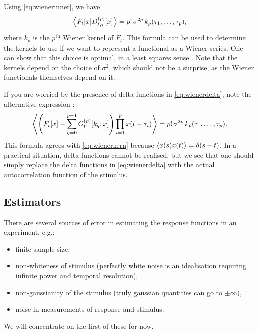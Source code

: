 \documentclass[12pt]{article}
\theoremstyle{slplain}
\theoremstyle{sldefinition}
\theoremstyle{remark}
\begin{document}
Using \eqref{eq:wienerinner}, we have
%
\begin{equation}\label{eq:wienerkern}
  \left\langle F_t[x] D^{(p)}_{t,\vec{\tau}}[x] \right\rangle = p!\,\sigma^{2p}\,k_p(\tau_1,\ldots,\tau_p),
\end{equation}
%
where $k_p$ is the $p^{\text{th}}$ Wiener kernel of $F_t$. This formula can be used to determine the kernels to use if we want to represent a functional as a Wiener series. One can show that this choice is optimal, in a least squares sense \cite[\S15.2]{schetzen:1980}. Note that the kernels depend on the choice of $\sigma^2$, which should not be a surprise, as the Wiener functionals themselves depend on it.

If you are worried by the presence of delta functions in \eqref{eq:wienerdelta}, note the alternative expression \cite{Lee1965}:
%
\begin{equation}\label{eq:wieneralt}
  \left\langle \left (  F_t[x] - \sum_{q=0}^{p-1} G_t^{(p)}[k_q;x] \right ) \prod_{i=1}^p x(t-\tau_i)  \right\rangle = p!\,\sigma^{2p}\,k_p(\tau_1,\ldots,\tau_p).
\end{equation}
%
This formula agrees with \eqref{eq:wienerkern} because $\left\langle x(s)x(t) \right\rangle=\delta(s-t)$. In a practical situation, delta functions cannot be realised, but we see that one should simply replace the delta functions in \eqref{eq:wienerdelta} with the actual autocorrelation function of the stimulus.

\subsection{Estimators}\label{sec:wienerest}

There are several sources of error in estimating the response functions in an experiment, e.g.:
\begin{itemize}
  \item finite sample size,
  \item non-whiteness of stimulus (perfectly white noise is an idealisation requiring infinite power and temporal resolution),
  \item non-gaussianity of the stimulus (truly gaussian quantities can go to $\pm\infty$),
  \item noise in measurements of response and stimulus.
\end{itemize}
We will concentrate on the first of these for now.
\end{document}
